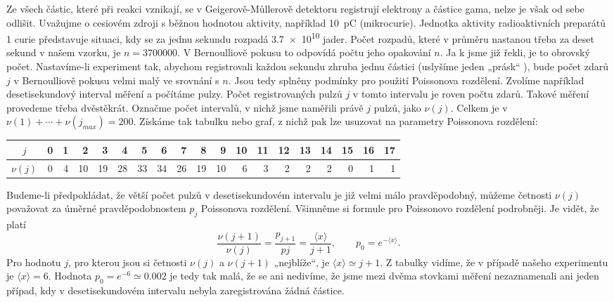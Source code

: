 \begin{example}
  Ze všech částic, které při reakci vznikají, se v Geigerově-Můllerově detektoru registrují 
  elektrony a částice gama, nelze je však od sebe odlišit. Uvažujme o cesiovém zdroji s běžnou 
  hodnotou aktivity, například \SI{10}{\pico\coulomb} (mikrocurie). Jednotka aktivity 
  radioaktivních preparátů \num{1} curie představuje situaci, kdy se za jednu sekundu rozpadá 
  \num{3.7e10} jader. Počet rozpadů, které v průměru nastanou třeba za deset sekund v našem vzorku, 
  je \(n = \num{3700000}\). V Bernoulliově pokusu to odpovídá počtu jeho opakování \(n\). Ja k jsme 
  již řekli, je to obrovský počet. Nastavíme-li experiment tak, abychom registrovali každou sekundu 
  zhruba jednu částici (uslyšíme jeden „prásk“ ), bude počet zdarů \(j\) v Bernoulliově pokusu 
  velmi malý ve srovnání s \(n\). Jsou tedy splněny podmínky pro použití Poissonova rozdělení. 
  Zvolíme například desetisekundový interval měření a počítáme pulzy. Počet registrovaných pulzů 
  \(j\) v tomto intervalu je roven počtu zdarů. Takové měření provedeme třeba dvěstěkrát.
  Označme počet intervalů, v nichž jsme naměřili právě \(j\) pulzů, jako \(\nu(j)\). Celkem je v 
  \(\nu(1) + \cdots + \nu(j_{max}) = \num{200}\). Získáme tak tabulku nebo graf, z nichž pak lze 
  usuzovat na parametry Poissonova rozdělení:
  \begin{table}[ht!]
    \centering
    \begin{tabular}{c|crrrrrrrrrrrrrrrrr}
      \(j\)      & 0 & 1 & 2 & 3 & 4 & 5 & 6 & 7 & 8 & 9 & 10 & 11& 12& 13 & 14 & 15 & 16 & 17   \\
      \hline
      \(\nu(j)\) & 0 & 4 & 10 & 19 & 28 & 33 & 34 & 26 & 19 & 10 & 6 & 3 & 2 & 2 & 2 & 0 & 1 & 1 \\
    \end{tabular}
  \end{table}
  Budeme-li předpokládat, že větší počet pulzů v desetisekundovém intervalu je již velmi málo 
  pravděpodobný, můžeme četnosti \(\nu(j)\) považovat za úměrné pravděpodobnostem \(p_j\) 
  Poissonova rozdělení. Všimněme si formule pro Poissonovo rozdělení podrobněji. Je vidět, že platí
  \begin{equation*}
    \dfrac{\nu(j + 1)}{\nu(j)} = \dfrac{p_{j+1}}{p{j}} = \dfrac{\langle x \rangle}{j + 1},
    \qquad p_0 = e^{-\langle x \rangle}.
  \end{equation*}
  Pro hodnotu \(j\), pro kterou jsou si četnosti \(\nu(j)\) a \(\nu(j + 1)\) „nejblíže“, je 
  \(\langle x \rangle \simeq j + 1\). Z tabulky vidíme, že v případě našeho experimentu je 
  \(\langle x \rangle = 6\). Hodnota \(p_0 = e^{-6} \simeq \num{0.002}\) je tedy tak malá, že se 
  ani nedivíme, že jsme mezi dvěma stovkami měření nezaznamenali ani jeden případ, kdy v 
  desetisekundovém intervalu nebyla zaregistrována žádná částice.
  

\end{example}
